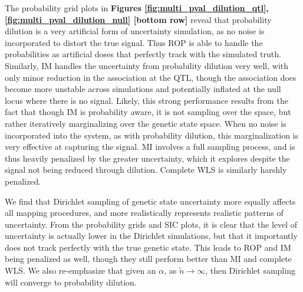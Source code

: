 The probability grid plots in \textbf{Figures \ref{fig:multi_pval_dilution_qtl}, \ref{fig:multi_pval_dilution_null} [bottom row]} reveal that probability dilution is a very artificial form of uncertainty simulation, as no noise is incorporated to distort the true signal. Thus ROP is able to handle the probabilities as artificial doses that perfectly track with the simulated truth. Similarly, IM handles the uncertainty from probability dilution very well, with only minor reduction in the association at the QTL, though the association does become more unstable across simulations and potentially inflated at the null locus where there is no signal. Likely, this strong performance results from the fact that though IM is probability aware, it is not sampling over the space, but rather iteratively marginalizing over the genetic state space. When no noise is incorporated into the system, as with probability dilution, this marginalization is very effective at capturing the signal. MI involves a full sampling process, and is thus heavily penalized by the greater uncertainty, which it explores despite the signal not being reduced through dilution. Complete WLS is similarly harshly penalized.

We find that Dirichlet sampling of genetic state uncertainty more equally affects all mapping procedures, and more realistically represents realistic patterns of uncertainty. From the probability grids and SIC plots, it is clear that the level of uncertainty is actually lower in the Dirichlet simulations, but that it importantly does not track perfectly with the true genetic state. This leads to ROP and IM being penalized as well, though they still perform better than MI and complete WLS. We also re-emphasize that given an $\alpha$, as $\tilde{n} \rightarrow \infty$, then Dirichlet sampling will converge to probability dilution.

